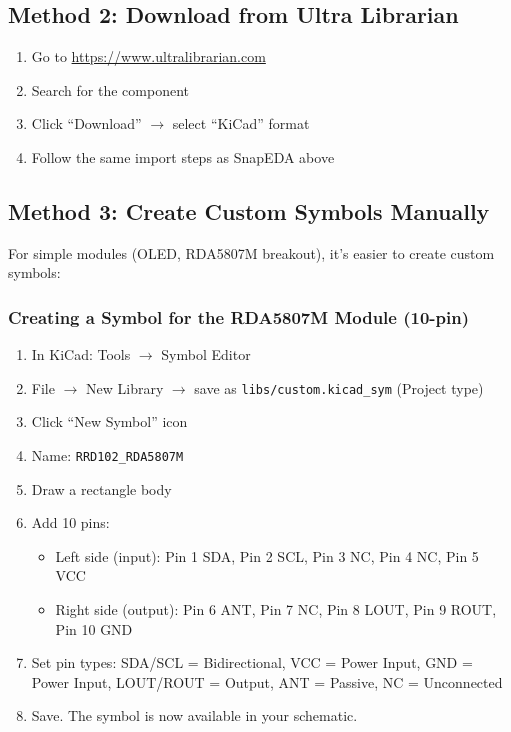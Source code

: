\documentclass[a4paper,11pt]{article}
\renewcommand*{\,}{ }%
\begin{document}
\subsection{Method 2: Download from Ultra Librarian}

\begin{enumerate}
    \item Go to \url{https://www.ultralibrarian.com}
    \item Search for the component
    \item Click ``Download'' $\rightarrow$ select ``KiCad'' format
    \item Follow the same import steps as SnapEDA above
\end{enumerate}

\subsection{Method 3: Create Custom Symbols Manually}

For simple modules (OLED, RDA5807M breakout), it's easier to create custom symbols:

\subsubsection{Creating a Symbol for the RDA5807M Module (10-pin)}

\begin{enumerate}
    \item In KiCad: Tools $\rightarrow$ Symbol Editor
    \item File $\rightarrow$ New Library $\rightarrow$ save as \texttt{libs/custom.kicad\_sym} (Project type)
    \item Click ``New Symbol'' icon
    \item Name: \texttt{RRD102\_RDA5807M}
    \item Draw a rectangle body
    \item Add 10 pins:
    \begin{itemize}[noitemsep]
        \item Left side (input): Pin 1 SDA, Pin 2 SCL, Pin 3 NC, Pin 4 NC, Pin 5 VCC
        \item Right side (output): Pin 6 ANT, Pin 7 NC, Pin 8 LOUT, Pin 9 ROUT, Pin 10 GND
    \end{itemize}
    \item Set pin types: SDA/SCL = Bidirectional, VCC = Power Input, GND = Power Input, LOUT/ROUT = Output, ANT = Passive, NC = Unconnected
    \item Save. The symbol is now available in your schematic.
\end{enumerate}
\end{document}
